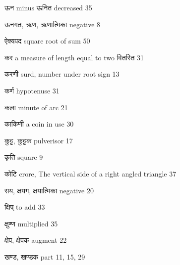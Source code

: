 \documentclass[]{article}
\begin{document}
{ऊन minus ऊनित decreased 35}

{ऊनगत, ऋण, ऋणात्मिका negative 8}

{ऐक्यपद square root of sum 50}

{कर a measure of length equal to two वितस्ति 31}

{करणी surd, number under root sign 13}

{कर्ण hypotenuse 31}

{कला minute of arc 21}

{काकिणी a coin in use 30}

{कुट्ट, कुट्टक pulverisor 17}

{कृति square 9}

{कोटि crore, The vertical side of a right angled triangle 37}

{सय, क्षयग, क्षयात्मिका negative 20}

{क्षिप् to add 33}

{क्षुण्ण multiplied 35}

{क्षेप, क्षेपक augment 22}

{खण्ड, खण्डक part 11, 15, 29}
\end{document}
